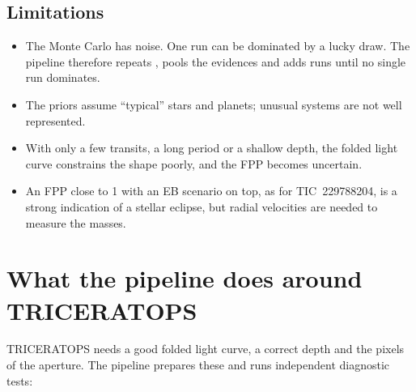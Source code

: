 \documentclass[11pt,a4paper]{report}
\newcommand{\code}[1]{\path{#1}}
\begin{document}
\section{Limitations}

\begin{itemize}
\item The Monte Carlo has noise. One run can be dominated by a lucky draw.
The pipeline therefore repeats \code{calc_probs}, pools the evidences and
adds runs until no single run dominates.
\item The priors assume ``typical'' stars and planets; unusual systems are
not well represented.
\item With only a few transits, a long period or a shallow depth, the folded
light curve constrains the shape poorly, and the FPP becomes uncertain.
\item An FPP close to 1 with an EB scenario on top, as for TIC~229788204,
is a strong indication of a stellar eclipse, but radial velocities are needed
to measure the masses.
\end{itemize}

\chapter{What the pipeline does around TRICERATOPS}
\label{ch:pipeline}

TRICERATOPS needs a good folded light curve, a correct depth and the pixels of
the aperture. The pipeline prepares these and runs independent diagnostic
tests:
\end{document}
